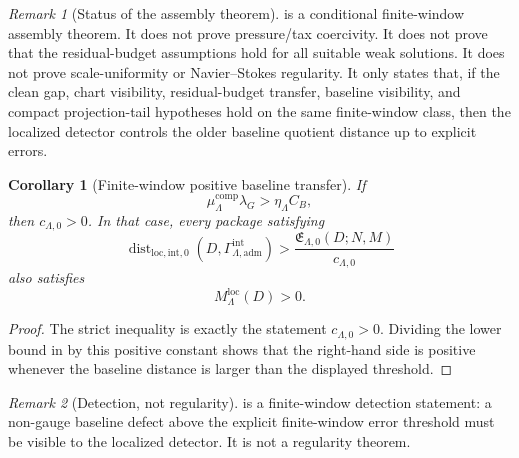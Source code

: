 \documentclass[11pt]{article}
\numberwithin{equation}{section}
\newtheorem{corollary}[corollary]{Corollary}
\theoremstyle{definition}
\theoremstyle{remark}
\newtheorem{remark}[remark]{Remark}
\newcommand{\loc}{\mathrm{loc}}
\newcommand{\intg}{\mathrm{int}}
\newcommand{\adm}{\mathrm{adm}}
\newcommand{\Dist}{\operatorname{dist}}
\newcommand{\Gammaadm}{\Gamma^{\intg}_{\Lambda,\adm}}
\begin{document}
\begin{remark}[Status of the assembly theorem]
 is a conditional finite-window
assembly theorem.  It does not prove pressure/tax coercivity.  It does not
prove that the residual-budget assumptions hold for all suitable weak
solutions.  It does not prove scale-uniformity or Navier--Stokes regularity.
It only states that, if the clean gap, chart visibility, residual-budget
transfer, baseline visibility, and compact projection-tail hypotheses hold on
the same finite-window class, then the localized detector controls the older
baseline quotient distance up to explicit errors.
\end{remark}

\begin{corollary}[Finite-window positive baseline transfer]
\label{cor:positive-baseline-transfer}
If
\[
    \mu^{\mathrm{comp}}_\Lambda\lambda_G
    >
    \eta_\Lambda C_B,
\]
then \(c_{\Lambda,0}>0\).  In that case, every package satisfying
\[
    \Dist_{\loc,\intg,0}(D,\Gammaadm)
    >
    \frac{\mathfrak E_{\Lambda,0}(D;N,M)}{c_{\Lambda,0}}
\]
also satisfies
\[
    M^{\loc}_\Lambda(D)>0.
\]
\end{corollary}

\begin{proof}
The strict inequality is exactly the statement \(c_{\Lambda,0}>0\).  Dividing
the lower bound in  by this positive
constant shows that the right-hand side is positive whenever the baseline
distance is larger than the displayed threshold.
\end{proof}

\begin{remark}[Detection, not regularity]
 is a finite-window detection statement:
a non-gauge baseline defect above the explicit finite-window error threshold
must be visible to the localized detector.  It is not a regularity theorem.
\end{remark}
\end{document}

